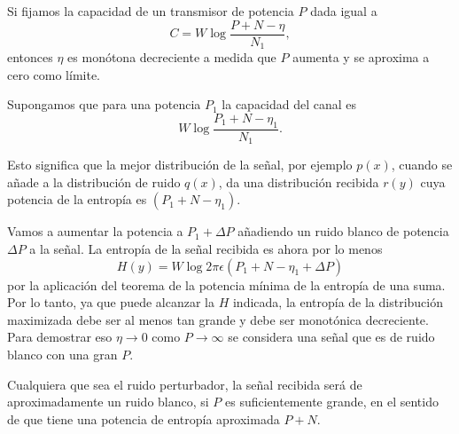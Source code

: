 \begin{theorem}
\label{t19}
Si fijamos la capacidad de un transmisor de potencia $P$ dada igual
a 
\begin{equation}
 C = W\log \frac{P+N - \eta}{N_{1}},
\end{equation}
entonces $\eta$ es mon\'otona decreciente a medida que $P$ aumenta y
se aproxima a cero como l\'imite.
\end{theorem}
	
Supongamos que para una potencia $P_{1}$ la capacidad del canal es
\begin{equation}
W\log \frac{P_{1} + N - \eta_{1}}{N_{1}}.
\end{equation}

Esto significa que la mejor distribuci\'on de la se\~nal, por ejemplo
$p(x)$, cuando se a\~nade a la distribuci\'on de ruido $q(x)$, da una
distribuci\'on recibida $r(y)$ cuya potencia de la entrop\'ia es
$(P_{1} + N - \eta_{1})$.
	
Vamos a aumentar la potencia a $P_{1} + \Delta P$ a\~nadiendo un ruido
blanco de potencia $\Delta P$ a la se\~nal.  La entrop\'ia de la
se\~nal recibida es ahora por lo menos
\begin{equation}
H(y) = W \log 2\pi \epsilon (P_{1}+N-\eta_{1}+\Delta P)
\end{equation}
por la aplicaci\'on del teorema de la potencia m\'inima de la
entrop\'ia de una suma.  Por lo tanto, ya que puede alcanzar la $H$
indicada, la entrop\'ia de la distribuci\'{o}n maximizada debe ser al
menos tan grande y debe ser monot\'onica decreciente.  Para demostrar
eso $\eta \rightarrow 0$ como $P \rightarrow \infty$ se considera una
se\~nal que es de ruido blanco con una gran $P$.
	
Cualquiera que sea el ruido perturbador, la se\~nal recibida ser\'a de
aproximadamente un ruido blanco, si $P$ es suficientemente grande, en
el sentido de que tiene una potencia de entrop\'ia aproximada $P + N$.
	



